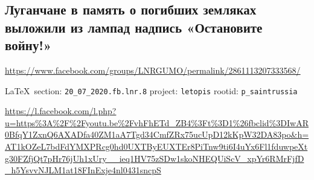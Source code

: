  
 
\subsection{Луганчане в память о погибших земляках выложили из лампад надпись «Остановите войну!»}
\label{sec:20_07_2020.fb.lnr.8}
\url{https://www.facebook.com/groups/LNRGUMO/permalink/2861113207333568/}
  
\vspace{0.5cm}
{\small\LaTeX~section: \verb|20_07_2020.fb.lnr.8| project: \verb|letopis| rootid: \verb|p_saintrussia|}
\vspace{0.5cm}
  

\url{https://l.facebook.com/l.php?u=https%3A%2F%2Fyoutu.be%2FvhFhETd_ZB4%3Ft%3D1%26fbclid%3DIwAR0BfqY1ZxnQ6AXADfa40ZM1aA7Tgd34CmfZRx75ucUpD12kKpW32DA83po&h=AT1kOZeL7bdFdYMXPRcg0hd0UXTByEUXTEr8PiTnw9ti6I4uYx6Fl1fduwpeXtg30FZfjQt7pHr76jUh1xUry__ieq1HV75zSDw1skoNHEQUiScV_xpYr6RMrFjfD_h5YsvvNJLM1at18FInExje4nl0431sncpS}
